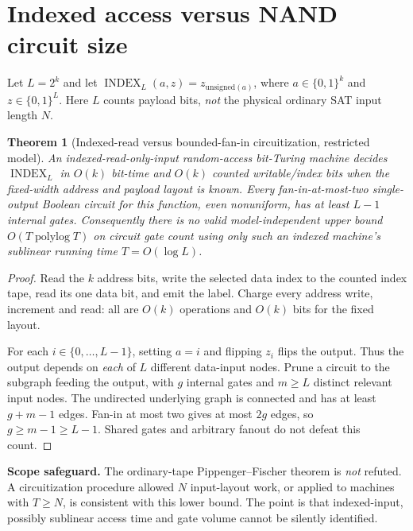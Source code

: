 \documentclass[11pt]{article}
\newtheorem{theorem}{Theorem}
\begin{document}
\section{Indexed access versus NAND circuit size}
Let $L=2^k$ and let
$\operatorname{INDEX}_L(a,z)=z_{\mathrm{unsigned}(a)}$,
where $a\in\{0,1\}^k$ and $z\in\{0,1\}^L$.
Here $L$ counts payload bits, \emph{not} the physical ordinary SAT input length $N$.

\begin{theorem}[Indexed-read versus bounded-fan-in circuitization, restricted model]\label{th:index}
An indexed-read-only-input random-access bit-Turing machine decides $\operatorname{INDEX}_L$ in $O(k)$ bit-time and $O(k)$ counted writable/index bits when the fixed-width address and payload layout is known. Every fan-in-at-most-two single-output Boolean circuit for this function, even nonuniform, has at least $L-1$ internal gates. Consequently there is no valid \emph{model-independent} upper bound $O(T\operatorname{polylog}T)$ on circuit gate count using only such an indexed machine's sublinear running time $T=O(\log L)$.
\end{theorem}
\begin{proof}
Read the $k$ address bits, write the selected data index to the counted index tape, read its one data bit, and emit the label. Charge every address write, increment and read: all are $O(k)$ operations and $O(k)$ bits for the fixed layout.

For each $i\in\{0,\dots,L-1\}$, setting $a=i$ and flipping $z_i$ flips the output. Thus the output depends on \emph{each} of $L$ different data-input nodes. Prune a circuit to the subgraph feeding the output, with $g$ internal gates and $m\ge L$ distinct relevant input nodes. The undirected underlying graph is connected and has at least $g+m-1$ edges. Fan-in at most two gives at most $2g$ edges, so $g\ge m-1\ge L-1$. Shared gates and arbitrary fanout do not defeat this count.
\end{proof}
\textbf{Scope safeguard.} The ordinary-tape Pippenger--Fischer theorem is \emph{not} refuted. A circuitization procedure allowed $N$ input-layout work, or applied to machines with $T\ge N$, is consistent with this lower bound. The point is that indexed-input, possibly sublinear access time and gate volume cannot be silently identified.
\end{document}
